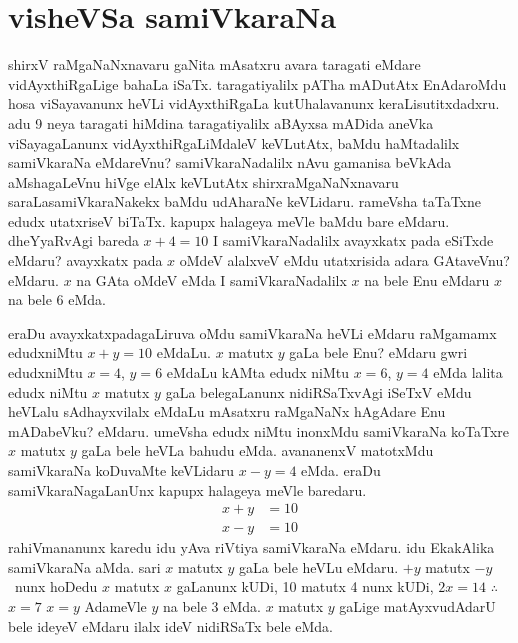 \chapter{visheVSa samiVkaraNa}

shirxV raMgaNaNxnavaru gaNita mAsatxru avara taragati eMdare vidAyxthiRgaLige bahaLa iSaTx. taragatiyalilx pATha mADutAtx EnAdaroMdu hosa viSayavanunx heVLi vidAyxthiRgaLa kutUhalavanunx keraLisutitxdadxru. adu {\rm 9} neya taragati hiMdina taragatiyalilx aBAyxsa mADida aneVka viSayagaLanunx vidAyxthiRgaLiMdaleV keVLutAtx, baMdu haMtadalilx samiVkaraNa eMdareVnu? samiVkaraNadalilx nAvu gamanisa beVkAda aMshagaLeVnu hiVge elAlx keVLutAtx shirxraMgaNaNxnavaru saraLasamiVkaraNakekx baMdu udAharaNe keVLidaru. rameVsha taTaTxne edudx utatxriseV biTaTx. kapupx halageya meVle baMdu bare eMdaru. dheYyaRvAgi bareda \quad $x+4=10$ \quad I samiVkaraNadalilx avayxkatx pada eSiTxde eMdaru? avayxkatx pada $x$ oMdeV alalxveV eMdu utatxrisida adara GAtaveVnu? eMdaru. $x$ na GAta oMdeV eMda I samiVkaraNadalilx $x$ na bele Enu eMdaru $x$ na bele {\rm 6} eMda.

eraDu avayxkatxpadagaLiruva oMdu samiVkaraNa heVLi eMdaru raMgamamx edudxniMtu \quad $x+y=10$ \quad eMdaLu. $x$ matutx $y$ gaLa bele Enu? eMdaru gwri edudxniMtu \quad $x=4$, \quad $y=6$ \quad eMdaLu kAMta edudx niMtu \quad $x=6$, \quad $y=4$ \quad eMda lalita edudx niMtu $x$ matutx $y$ gaLa belegaLanunx nidiRSaTxvAgi iSeTxV eMdu heVLalu sAdhayxvilalx eMdaLu mAsatxru raMgaNaNx hAgAdare Enu mADabeVku? eMdaru. umeVsha edudx niMtu inonxMdu samiVkaraNa koTaTxre $x$ matutx $y$ gaLa bele heVLa bahudu eMda. avananenxV matotxMdu samiVkaraNa koDuvaMte keVLidaru \quad $x-y=4$ \quad eMda. eraDu samiVkaraNagaLanUnx kapupx halageya meVle baredaru.
\begin{align*}
x+y &=10\\
x-y &=10
\end{align*}
rahiVmananunx karedu idu yAva riVtiya samiVkaraNa eMdaru. idu EkakAlika samiVkaraNa aMda. sari $x$ matutx $y$ gaLa bele heVLu eMdaru. $+y$ \quad matutx \quad $-y$~nunx hoDedu $x$ matutx $x$ gaLanunx kUDi, {\rm 10} matutx {\rm 4} nunx kUDi, \quad $2x=14$ \quad $\therefore$ $x=7$ \quad $x=y$ \quad AdameVle $y$ na bele {\rm 3} eMda. $x$ matutx $y$ gaLige matAyxvudAdarU bele ideyeV eMdaru ilalx ideV nidiRSaTx bele eMda.

